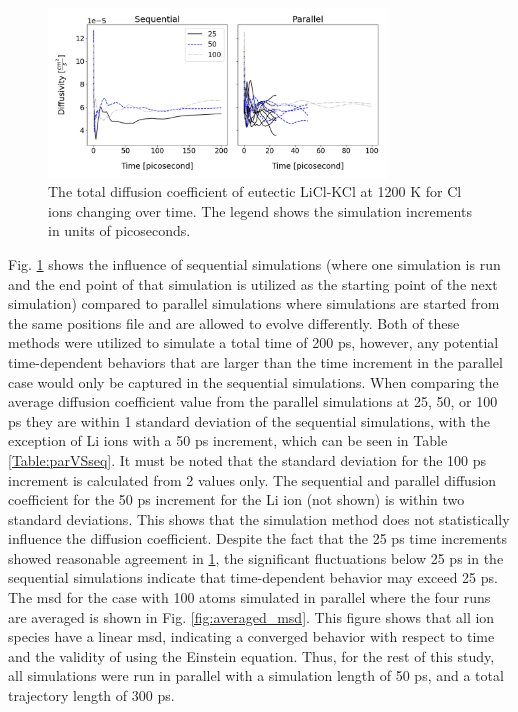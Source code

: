 \documentclass[review]{elsarticle}
\begin{document}
\begin{figure}[h!]
 \centering
 \includegraphics[width=0.8\textwidth]{SeqVsPar_Cl.png} 
 \caption{The total diffusion coefficient of eutectic LiCl-KCl at 1200 K for Cl ions changing over time. The legend shows the simulation increments in units of picoseconds.}
 \label{fig:SeqVsPar}
\end{figure} 

Fig. \ref{fig:SeqVsPar} shows the influence of sequential simulations (where one simulation is run and the end point of that simulation is utilized as the starting point of the next simulation) compared to parallel simulations where simulations are started from the same positions file and are allowed to evolve differently. Both of these methods were utilized to simulate a total time of 200 ps, however, any potential time-dependent behaviors that are larger than the time increment in the parallel case would only be captured in the sequential simulations. When comparing the average diffusion coefficient value from the parallel simulations at 25, 50, or 100 ps they are within 1 standard deviation of the sequential simulations, with the exception of Li ions with a 50 ps increment, which can be seen in Table \ref{Table:parVSseq}. It must be noted that the standard deviation for the 100 ps increment is calculated from 2 values only. The sequential and parallel diffusion coefficient for the 50 ps increment for the Li ion (not shown) is within two standard deviations. This shows that the simulation method does not statistically influence the diffusion coefficient. Despite the fact that the 25 ps time increments showed reasonable agreement in \cref{fig:SeqVsPar}, the significant fluctuations below 25 ps in the sequential simulations indicate that time-dependent behavior may exceed 25 ps. The msd for the case with 100 atoms simulated in parallel where the four runs are averaged is shown in Fig. \ref{fig:averaged_msd}. This figure shows that all ion species have a linear msd, indicating a converged behavior with respect to time and the validity of using the Einstein equation. Thus, for the rest of this study, all simulations were run in parallel with a simulation length of 50 ps, and a total trajectory length of 300 ps.
\end{document}
